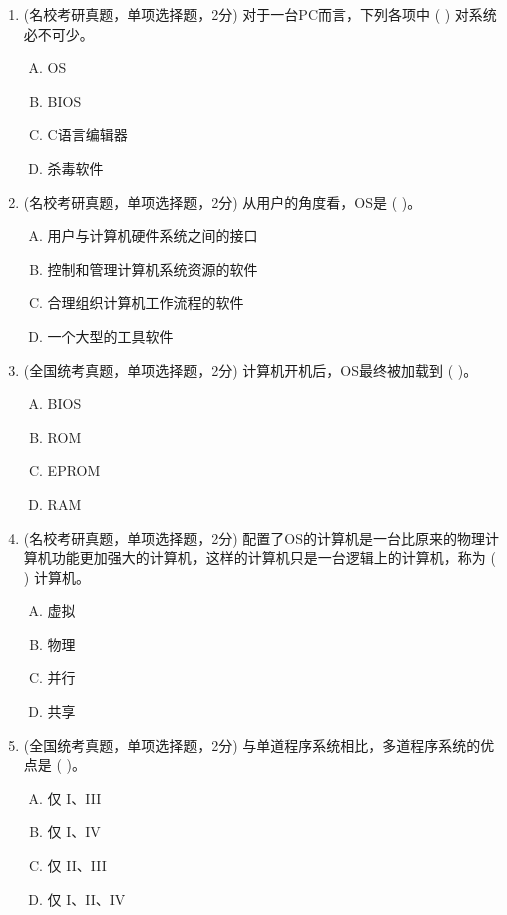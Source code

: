 \documentclass[lang=cn,newtx,10pt,scheme=chinese]{../../elegantbook}
\begin{document}
\begin{enumerate}
    \item (名校考研真题，单项选择题，2分) 对于一台PC而言，下列各项中 (    ) 对系统必不可少。
    \begin{enumerate}[A.]
        \item OS
        \item BIOS
        \item C语言编辑器
        \item 杀毒软件
    \end{enumerate}

    \item (名校考研真题，单项选择题，2分) 从用户的角度看，OS是 (   )。
    \begin{enumerate}[A.]
        \item 用户与计算机硬件系统之间的接口
        \item 控制和管理计算机系统资源的软件
        \item 合理组织计算机工作流程的软件
        \item 一个大型的工具软件
    \end{enumerate}

    \item (全国统考真题，单项选择题，2分) 计算机开机后，OS最终被加载到 (    )。
    \begin{enumerate}[A.]
        \item BIOS
        \item ROM
        \item EPROM
        \item RAM
    \end{enumerate}

    \item (名校考研真题，单项选择题，2分) 配置了OS的计算机是一台比原来的物理计算机功能更加强大的计算机，这样的计算机只是一台逻辑上的计算机，称为 (    ) 计算机。
    \begin{enumerate}[A.]
        \item 虚拟
        \item 物理
        \item 并行
        \item 共享
    \end{enumerate}

    \item (全国统考真题，单项选择题，2分) 与单道程序系统相比，多道程序系统的优点是 (    )。
    \begin{enumerate}[A.]
        \item 仅 I、III
        \item 仅 I、IV
        \item 仅 II、III
        \item 仅 I、II、IV
    \end{enumerate}


\end{enumerate}
\end{document}
